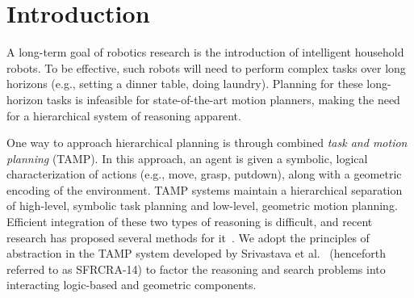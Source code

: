 \section{Introduction}
A long-term goal of robotics research is the introduction of
intelligent household robots.  To be effective, such robots will need
to perform complex tasks over long horizons (e.g., setting a dinner
table, doing laundry). Planning for these long-horizon tasks is
infeasible for state-of-the-art motion planners, making the need for a
hierarchical system of reasoning apparent.

One way to approach hierarchical planning is through combined
\emph{task and motion planning} (TAMP). In this approach, an agent is
given a symbolic, logical characterization of actions (e.g., move,
grasp, putdown), along with a geometric encoding of the
environment. TAMP systems maintain a hierarchical separation of
high-level, symbolic task planning and low-level, geometric motion
planning.  Efficient integration of these two types of reasoning is
difficult, and recent research has proposed several methods for
it~\cite{srivastava2014combined, kaelbling2011hierarchical,
  lagriffoul2014orientation, GarrettWAFR14, dornhege2012semantic}.
We adopt the principles of abstraction in the TAMP system developed by
Srivastava et al.~\cite{srivastava2014combined} (henceforth referred
to as SFRCRA-14) to factor the reasoning and search problems into
interacting logic-based and geometric components.

